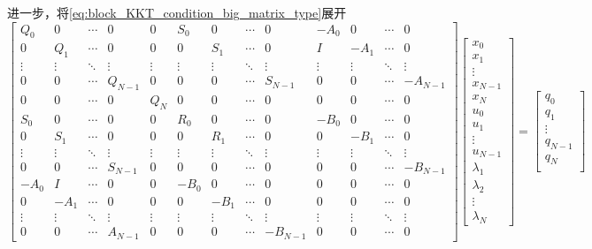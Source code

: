 \documentclass[withoutpreface,bwprint]{NoteBook}
\begin{document}
进一步，将\cref{eq:block_KKT_condition_big_matrix_type}展开
\begin{equation}
\label{eq:block_KKT_condition_detail}
\begin{bmatrix}
Q_0 & 0 & \cdots & 0 & 0 & S_0 & 0 & \cdots & 0 & -A_0 & 0 & \cdots & 0 \\
0 	& Q_1 & \cdots & 0 & 0 & 0 & S_1  & \cdots & 0 & I & -A_1 & \cdots & 0 \\
\vdots &  \vdots & \ddots & \vdots &\vdots &\vdots & \vdots& \ddots & \vdots & \vdots & \vdots & \ddots & \vdots \\
0 & 0 & \cdots & Q_{N-1} & 0 & 0 & 0 &\cdots & S_{N-1} & 0 & 0 &\cdots & -A_{N-1} \\
0 & 0 & \cdots & 0 & Q_N & 0 & 0 &\cdots & 0 & 0 & 0 &\cdots & 0 \\
S_0 & 0 & \cdots & 0 & 0 & R_0 & 0 & \cdots & 0 & -B_0 & 0 & \cdots & 0\\
0 & S_1 & \cdots & 0 & 0 & 0 & R_1 & \cdots & 0 & 0 & -B_1 & \cdots & 0\\
\vdots &  \vdots & \ddots & \vdots & \vdots & \vdots &  \vdots & \ddots & \vdots & \vdots &  \vdots & \ddots & \vdots\\
0 & 0 & \cdots & S_{N-1} & 0 & 0 & 0 & \cdots & 0 & 0 & 0 & \cdots & -B_{N-1}\\
-A_0 & I & \cdots & 0 & 0 & -B_0 & 0 & \cdots & 0 & 0 & 0 & \cdots & 0 \\
0 & -A_1 & \cdots & 0 & 0 & 0 & -B_1 & \cdots & 0 & 0 & 0 & \cdots & 0 \\
\vdots &  \vdots & \ddots & \vdots & \vdots & \vdots &  \vdots & \ddots & \vdots & \vdots &  \vdots & \ddots & \vdots \\
0 	   & 0 	& \cdots & A_{N-1} & 0 & 0 & 0 & \cdots & -B_{N-1} & 0 & 0 & \cdots & 0 
\end{bmatrix}
\begin{bmatrix}
x_0 \\ x_1 \\ \vdots \\ x_{N-1} \\ x_{N} \\
u_0 \\ u_1 \\ \vdots \\ u_{N-1} \\
\lambda_{1} \\ \lambda_{2} \\ \vdots \\ \lambda_{N}
\end{bmatrix}
=\begin{bmatrix}
q_0\\
q_1 \\
\vdots \\
q_{N-1} \\
q_{N} \\


\end{bmatrix}
\end{equation}
\end{document}
